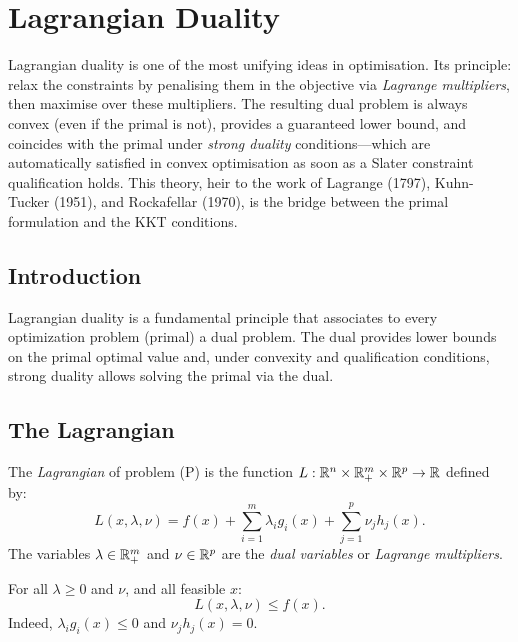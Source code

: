 \chapter{Lagrangian Duality}
\label{ch:lagrangian}

Lagrangian duality is one of the most unifying ideas in optimisation. Its principle: relax the constraints by penalising them in the objective via \emph{Lagrange multipliers}, then maximise over these multipliers. The resulting dual problem is always convex (even if the primal is not), provides a guaranteed lower bound, and coincides with the primal under \emph{strong duality} conditions---which are automatically satisfied in convex optimisation as soon as a Slater constraint qualification holds. This theory, heir to the work of Lagrange (1797), Kuhn-Tucker (1951), and Rockafellar (1970), is the bridge between the primal formulation and the KKT conditions.

\section{Introduction}

Lagrangian duality is a fundamental principle that associates to every optimization
problem (primal) a dual problem. The dual provides lower bounds on the primal optimal
value and, under convexity and qualification conditions, strong duality allows solving
the primal via the dual.

\section{The Lagrangian}

\begin{definition}[Lagrangian]
The \emph{Lagrangian} of problem (P) is the function
$L : \mathbb{R}^n \times \mathbb{R}^m_+ \times \mathbb{R}^p \to \mathbb{R}$ defined by:
\[
    L(x, \lambda, \nu) = f(x) + \sum_{i=1}^m \lambda_i g_i(x) + \sum_{j=1}^p \nu_j h_j(x).
\]
The variables $\lambda \in \mathbb{R}^m_+$ and $\nu \in \mathbb{R}^p$ are the \emph{dual variables}
or \emph{Lagrange multipliers}.
\end{definition}

\begin{proposition}
For all $\lambda \geq 0$ and $\nu$, and all feasible $x$:
\[
    L(x, \lambda, \nu) \leq f(x).
\]
Indeed, $\lambda_i g_i(x) \leq 0$ and $\nu_j h_j(x) = 0$.
\end{proposition}

